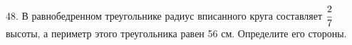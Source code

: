 48. В равнобедренном треугольнике радиус вписанного круга составляет $\cfrac{2}{7}$ высоты, а периметр этого треугольника равен 56 см. Определите его стороны.\\
